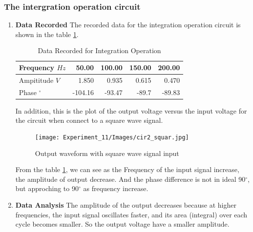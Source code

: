 
    \subsubsection{The intergration operation circuit}
    \begin{enumerate}
        \item \textbf{Data Recorded}\newline
            The recorded data for the integration operation circuit is shown in the table \ref{tab:int}.

            \begin{table}[H]
                \centering
                \begin{tabular}{l|rrrr}
                Frequency $Hz$ & 50.00  & 100.00  & 150.00  & 200.00  \\
                \midrule
                Ampititude $V$ & 1.850  & 0.935  & 0.615  & 0.470  \\
                Phase $^\circ$ & -104.16 & -93.47 & -89.7 & -89.83 \\
                \end{tabular}%
                \caption{Data Recorded for Integration Operation}
                \label{tab:int}
            \end{table}

            In addition, this is the plot of the output voltage versus the input voltage for the circuit when connect to a square wave signal.
            \begin{figure}[H]
                \centering
                \texttt{[image: Experiment\_11/Images/cir2\_squar.jpg]}
                \caption{Output waveform with square wave signal input}
                \label{wave:int}
            \end{figure}

            From the table \ref{tab:int}, we can see as the Frequency of the input signal increase, the amplitude of output decrease. And the phase difference is not in ideal 90$^\circ$, but approching to 90$^\circ$ as frequency increase.\par
        \item \textbf{Data Analysis}\newline
            The amplitude of the output decreases because at higher frequencies, the input signal oscillates faster, and its area (integral) over each cycle becomes smaller. So the output voltage have a smaller amplitude.\par


\end{enumerate}
